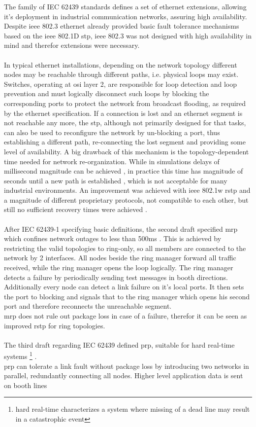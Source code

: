 The family of IEC 62439 standards defines a set of ethernet extensions, allowing it's deployment in industrial communication networks, assuring high availability.
Despite \gls{ieee} 802.3 ethernet already provided basic fault tolerance mechanisms based on the \gls{ieee} 802.1D \gls{stp}, \gls{ieee} 802.3 was 
not designed with high availability in mind and therefor extensions were necessary.
\\
\\
In typical ethernet installations, depending on the network topology different
nodes may be reachable through different paths, i.e. physical loops may exist. Switches, operating at \gls{osi} layer 2, are responsible for loop detection and
loop prevention and must logically disconnect such loops by blocking the corresponding ports to protect the network from broadcast flooding, as required by the ethernet specification.
If a connection is lost and an ethernet segment is not 
reachable any more, the \gls{stp}, although not primarily designed for that tasks, can also be used to reconfigure the network by
un-blocking a port, thus establishing a different path, re-connecting the lost segment and providing some level of availability.
A big drawback of this mechanism is the topology-dependent
time needed for network re-organization. While in simulations delays of millisecond magnitude can be achieved \cite{4447112}, in practice this time has magnitude of seconds
until a new path is established , which is not acceptable for many industrial environments. An improvement was achieved with \gls{ieee} 802.1w \gls{rstp} and
a magnitude of different proprietary protocols, not compatible to each other, but still no sufficient recovery times were achieved \cite{1704183}.
\\
\\
After IEC 62439-1 specifying basic definitions, the second draft specified \gls{mrp} which confines network outages to less than 500ms \cite{6145654}.
This is achieved by restricting the valid topologies to ring-only, so all members are connected to the network by 2 interfaces. All nodes beside the ring manager
forward all traffic received, while the ring manager opens the loop logically. The ring manager detects a failure by periodically sending test messages in booth
directions. Additionally every node can detect a link failure on it's local ports. It then sets the port to blocking  and signals that to the
ring manager which opens his second port and therefore reconnects the unreachable segment.
\\
\gls{mrp} does not rule out package loss in case of a failure, therefor it can be seen as improved \gls{rstp} for ring topologies.
\\
\\
The third draft regarding IEC 62439 defined {\gls{prp}}, suitable for hard real-time systems \footnote{hard real-time characterizes a system
where missing of a dead line may result in a catastrophic event} \cite{4416946}.
\\
\gls{prp} can tolerate a link fault without package loss by introducing two networks in parallel, redundantly connecting all nodes. Higher level application
data is sent on booth lines 
